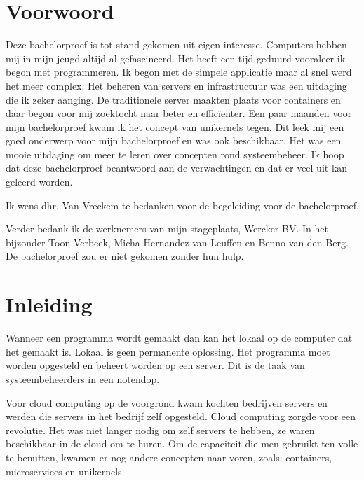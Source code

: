 \documentclass[pdftex,a4paper,12pt,twoside]{report}
\begin{document}
\begin{abstract}
\end{abstract}

\chapter*{Voorwoord}
\label{ch:voorwoord}

Deze bachelorproef is tot stand gekomen uit eigen interesse. Computers hebben mij in mijn jeugd altijd al gefascineerd. Het heeft een tijd geduurd vooraleer ik begon met programmeren. Ik begon met de simpele applicatie maar al snel werd het meer complex.  Het beheren van servers en infrastructuur was een uitdaging die ik zeker aanging. De traditionele server maakten plaats voor containers en daar begon voor mij zoektocht naar beter en efficïenter. Een paar maanden voor mijn bachelorproef kwam ik het concept van unikernels tegen. Dit leek mij een goed onderwerp voor mijn bachelorproef en was ook beschikbaar. Het was een mooie uitdaging om meer te leren over concepten rond systeembeheer. Ik hoop dat deze bachelorproef beantwoord aan de verwachtingen en dat er veel uit kan geleerd worden.

Ik wens dhr. Van Vreckem te bedanken voor de begeleiding voor de bachelorproef.

Verder bedank ik de werknemers van mijn stageplaats, Wercker BV. In het bijzonder Toon Verbeek, Micha Hernandez van Leuffen en Benno van den Berg. De bachelorproef zou er niet gekomen zonder hun hulp.

\tableofcontents

\chapter{Inleiding}
\label{ch:inleiding}

Wanneer een programma wordt gemaakt dan kan het lokaal op de computer dat het gemaakt is. Lokaal is geen permanente oplossing. Het programma moet worden opgesteld en beheert worden op een server. Dit is de taak van systeembeheerders in een notendop.

Voor cloud computing op de voorgrond kwam kochten bedrijven servers en werden die servers in het bedrijf zelf opgesteld. Cloud computing zorgde voor een revolutie. Het was niet langer nodig om zelf servers te hebben, ze waren beschikbaar in de cloud om te huren. Om de capaciteit die men gebruikt ten volle te benutten, kwamen er nog andere concepten naar voren, zoals: containers, microservices en unikernels.
\end{document}
